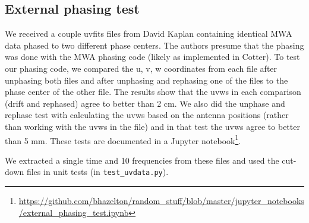 \documentclass[11pt, oneside]{article}   	%
\begin{document}
\subsection{External phasing test}
We received a couple uvfits files from David Kaplan containing identical MWA data phased to two different phase centers. The authors presume that the phasing was done with the MWA phasing code (likely as implemented in Cotter). To test our phasing code, we compared the u, v, w coordinates from each file after unphasing both files and after unphasing and rephasing one of the files to the phase center of the other file. The results show that the uvws in each comparison (drift and rephased) agree to better than 2 cm. We also did the unphase and rephase test with calculating the uvws based on the antenna positions (rather than working with the uvws in the file) and in that test the uvws agree to better than 5 mm. These tests are documented in a Jupyter notebook\footnote{\url{https://github.com/bhazelton/random_stuff/blob/master/jupyter_notebooks/external_phasing_test.ipynb}}.

We extracted a single time and 10 frequencies from these files and used the cut-down files in unit tests (in \verb!test_uvdata.py!).
\end{document}
